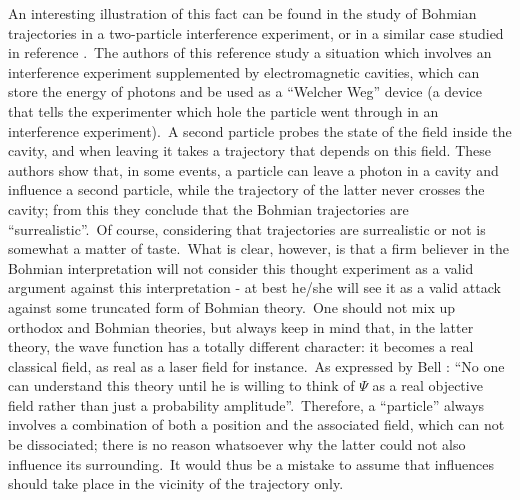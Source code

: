 \documentclass[12pt,onecolumn]{article}%
\begin{document}
An interesting illustration of this fact can be found in the study of Bohmian
trajectories in a two-particle interference experiment, or in a similar case
studied in reference \cite{Englert}.\ The authors of this reference study a
situation which involves an interference experiment supplemented by
electromagnetic cavities, which can store the energy of photons and be used as
a ``Welcher Weg'' device (a device that tells the experimenter which hole the
particle went through in an interference experiment).\ A second particle
probes the state of the field inside the cavity, and when leaving it takes a
trajectory that depends on this field. These authors show that, in some
events, a particle can leave a photon in a cavity and influence a second
particle, while the trajectory of the latter never crosses the cavity; from
this they conclude that the Bohmian trajectories are ``surrealistic''.\ Of
course, considering that trajectories are surrealistic or not is somewhat a
matter of taste.\ What is clear, however, is that a firm believer in the
Bohmian interpretation will not consider this thought experiment as a valid
argument against this interpretation - at best he/she will see it as a valid
attack against some truncated form of Bohmian theory.\ One should not mix up
orthodox and Bohmian theories, but always keep in mind that, in the latter
theory, the wave function has a totally different character: it becomes a real
classical field, as real as a laser field for instance.\ As expressed by Bell
\cite{Bell-no-one}: ``No one can understand this theory until he is willing to
think of $\Psi$ as a real objective field rather than just a probability
amplitude''.\ Therefore, a ``particle'' always involves a combination of both
a position and the associated field, which can not be dissociated; there is no
reason whatsoever why the latter could not also influence its surrounding.\ It
would thus be a mistake to assume that influences should take place in the
vicinity of the trajectory only.
\end{document}
